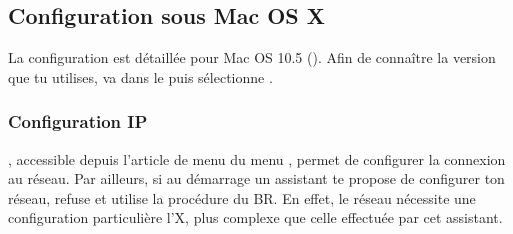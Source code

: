 



\subsection{Configuration sous Mac OS X}

La configuration est détaillée pour Mac OS 10.5 (). %
Afin de connaître la version que tu utilises, va dans le  puis sélectionne .

\subsubsection{Configuration IP}

 , accessible depuis l'article de menu  du menu , permet de configurer la connexion au réseau. Par ailleurs, si au démarrage un assistant te propose de configurer ton réseau, refuse et utilise la procédure du BR. En effet, le réseau nécessite une configuration particulière  l'X, plus complexe que celle effectuée par cet assistant.


